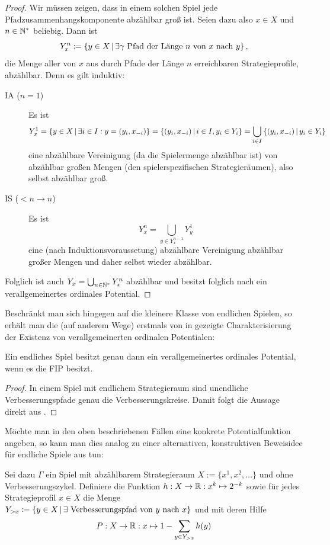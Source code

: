 \begin{proof}
	Wir müssen zeigen, dass in einem solchen Spiel jede Pfadzusammenhangskomponente abzählbar groß ist. Seien dazu also $x \in X$ und $n \in \mathbb{N}^\ast$ beliebig. Dann ist
		\[Y_x^n \coloneqq \left\{y \in X \,\middle|\, \exists \gamma \text{ Pfad der Länge $n$ von $x$ nach $y$}\right\}, \]
	die Menge aller von $x$ aus durch Pfade der Länge $n$ erreichbaren Strategieprofile, abzählbar. Denn es gilt induktiv:
	\begin{description}
		\item[IA ($n=1$)] Es ist
			\[Y_x^1 = \left\{y \in X \,\middle|\, \exists i \in I: y = (y_i, x_{-i})\right\} = \left\{(y_i, x_{-i}) \,\middle|\, i \in I, y_i \in Y_i \right\} = \bigcup_{i \in I} \left\{(y_i, x_{-i}) \,\middle|\, y_i \in Y_i \right\}\]
			eine abzählbare Vereinigung (da die Spielermenge abzählbar ist) von abzählbar großen Mengen (den spielerspezifischen Strategieräumen), also selbst abzählbar groß.
		\item[IS ($<n \to n$)] Es ist
			\[Y_x^n = \bigcup_{y \in Y_x^{n-1}} Y_y^1\]
			eine (nach Induktionsvoraussetung) abzählbare Vereinigung abzählbar großer Mengen und daher selbst wieder abzählbar.
	\end{description}
	Folglich ist auch $Y_x = \bigcup_{n\in\mathbb{N}^\ast} Y_x^n$ abzählbar und besitzt folglich nach  ein verallgemeinertes ordinales Potential.
\end{proof}

Beschränkt man sich hingegen auf die kleinere Klasse von endlichen Spielen, so erhält man die (auf anderem Wege) erstmals von \citeauthor{MonShap} in \cite[Lemma 2.5]{MonShap} gezeigte Charakterisierung der Existenz von verallgemeinerten ordinalen Potentialen:

\begin{kor}
	Ein endliches Spiel besitzt genau dann ein verallgemeinertes ordinales Potential, wenn es die FIP besitzt.
\end{kor}

\begin{proof}
	In einem Spiel mit endlichem Strategieraum sind unendliche Verbesserungspfade genau die Verbesserungskreise. Damit folgt die Aussage direkt aus .
\end{proof}

\begin{bem}
	Möchte man in den oben beschriebenen Fällen eine konkrete Potentialfunktion angeben, so kann man dies analog zu einer alternativen, konstruktiven Beweisidee für endliche Spiele aus \cite[Abschnitt 5]{CongGamesPlayerSpecPayoff} tun:

Sei dazu $\Gamma$ ein Spiel mit abzählbarem Strategieraum $X := \{x^1, x^2, \dots \}$ und ohne Verbesserungszykel. Definiere die Funktion $h: X \to \mathbb{R}: x^k \mapsto 2^{-k}$ sowie für jedes Strategieprofil $x \in X$ die Menge $Y_{>x} \coloneqq \left\{y \in X \,\middle|\, \exists \text{ Verbesserungspfad von } y \text{ nach } x\right\}$ und mit deren Hilfe
	\[P: X \to \mathbb{R}: x \mapsto 1 - \sum_{y \in Y_{>x}} h(y)\]
\end{bem}

